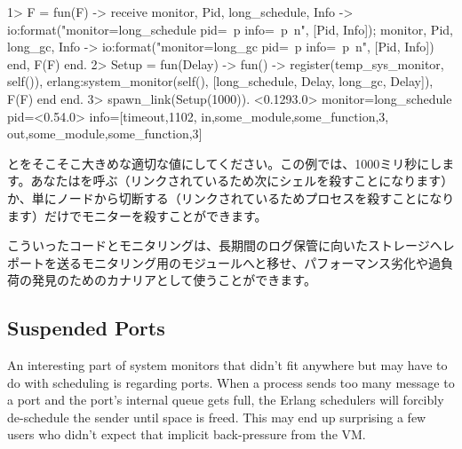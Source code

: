 \begin{VerbatimEshell}
1> F = fun(F) ->
    receive
        {monitor, Pid, long_schedule, Info} ->
            io:format("monitor=long_schedule pid=~p info=~p~n", [Pid, Info]);
        {monitor, Pid, long_gc, Info} -> 
            io:format("monitor=long_gc pid=~p info=~p~n", [Pid, Info])
    end,
    F(F)
end.
2> Setup = fun(Delay) -> fun() -> 
     register(temp_sys_monitor, self()),
     erlang:system_monitor(self(), [{long_schedule, Delay}, {long_gc, Delay}]),
     F(F)
end end.
3> spawn_link(Setup(1000)).
<0.1293.0>
monitor=long_schedule pid=<0.54.0> info=[{timeout,1102},
                                         {in,{some_module,some_function,3}},
                                         {out,{some_module,some_function,3}}]
\end{VerbatimEshell}

とをそこそこ大きめな適切な値にしてください。この例では、1000ミリ秒にします。あなたはを呼ぶ（リンクされているため次にシェルを殺すことになります）か、単にノードから切断する（リンクされているためプロセスを殺すことになります）だけでモニターを殺すことができます。

こういったコードとモニタリングは、長期間のログ保管に向いたストレージへレポートを送るモニタリング用のモジュールへと移せ、パフォーマンス劣化や過負荷の発見のためのカナリアとして使うことができます。

\subsection{Suspended Ports}
\label{subsec:port-system-monitors}

An interesting part of system monitors that didn't fit anywhere but may have to do with scheduling is regarding ports. When a process sends too many message to a port and the port's internal queue gets full, the Erlang schedulers will forcibly de-schedule the sender until space is freed. This may end up surprising a few users who didn't expect that implicit back-pressure from the VM.

